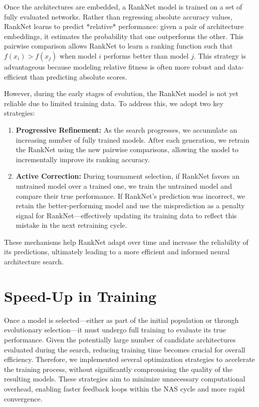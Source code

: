 Once the architectures are embedded, a RankNet model is trained on a set of fully evaluated networks. Rather than regressing absolute accuracy values, RankNet learns to predict *relative* performance: given a pair of architecture embeddings, it estimates the probability that one outperforms the other. This pairwise comparison allows RankNet to learn a ranking function such that $f(x_i) > f(x_j)$ when model $i$ performs better than model $j$. This strategy is advantageous because modeling relative fitness is often more robust and data-efficient than predicting absolute scores.

However, during the early stages of evolution, the RankNet model is not yet reliable due to limited training data. To address this, we adopt two key strategies:

\begin{enumerate}
    \item \textbf{Progressive Refinement:} As the search progresses, we accumulate an increasing number of fully trained models. After each generation, we retrain the RankNet using the new pairwise comparisons, allowing the model to incrementally improve its ranking accuracy.
    
    \item \textbf{Active Correction:} During tournament selection, if RankNet favors an untrained model over a trained one, we train the untrained model and compare their true performance. If RankNet’s prediction was incorrect, we retain the better-performing model and use the misprediction as a penalty signal for RankNet—effectively updating its training data to reflect this mistake in the next retraining cycle.
\end{enumerate}

These mechanisms help RankNet adapt over time and increase the reliability of its predictions, ultimately leading to a more efficient and informed neural architecture search.






\section{Speed-Up in Training}

Once a model is selected—either as part of the initial population or through evolutionary selection—it must undergo full training to evaluate its true performance. Given the potentially large number of candidate architectures evaluated during the search, reducing training time becomes crucial for overall efficiency. Therefore, we implemented several optimization strategies to accelerate the training process, without significantly compromising the quality of the resulting models. These strategies aim to minimize unnecessary computational overhead, enabling faster feedback loops within the NAS cycle and more rapid convergence.

